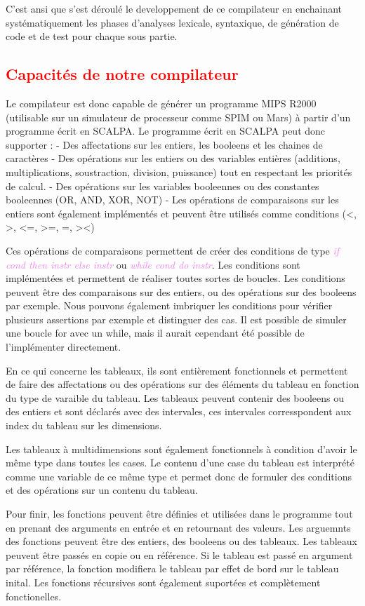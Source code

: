 \documentclass[a4paper]{article}
\let\oldtextit\textit
\renewcommand{\textit}[1]{\textcolor{violet}{\oldtextit{#1}}}
\newcommand{\csection}[1]{\textcolor{red}{\section{#1}}}
\begin{document}
C'est ansi que s'est déroulé le developpement de ce compilateur en enchainant systématiquement les phases d'analyses lexicale, syntaxique, de génération de code et de test pour chaque sous partie.

\csection{Capacités de notre compilateur}

Le compilateur est donc capable de générer un programme MIPS R2000 (utilisable sur un simulateur de processeur comme SPIM ou Mars) à partir d'un programme écrit en SCALPA.
Le programme écrit en SCALPA peut donc supporter :
- Des affectations sur les entiers, les booleens et les chaines de caractères
- Des opérations sur les entiers ou des variables entières (additions, multiplications, soustraction, division, puissance) tout en respectant les priorités de calcul.
- Des opérations sur les variables booleennes ou des constantes booleennes (OR, AND, XOR, NOT)
- Les opérations de comparaisons sur les entiers sont également implémentés et peuvent être utilisés comme conditions (<, >, <=, >=, =, ><)

Ces opérations de comparaisons permettent de créer des conditions de type \textit{if cond then instr else instr } ou \textit{while cond do instr}. Les conditions sont implémentées et permettent de réaliser toutes sortes de boucles. Les conditions peuvent être des comparaisons sur des entiers, ou des opérations sur des booleens par exemple.
Nous pouvons également imbriquer les conditions pour vérifier plusieurs assertions par exemple et distinguer des cas.
Il est possible de simuler une boucle for avec un while, mais il aurait cependant été possible de l'implémenter directement.

En ce qui concerne les tableaux, ils sont entièrement fonctionnels et permettent de faire des affectations ou des opérations sur des éléments du tableau en fonction du type de varaible du tableau. Les tableaux peuvent contenir des booleens ou des entiers et sont déclarés avec des intervales, ces intervales corresspondent aux index du tableau sur les dimensions.

Les tableaux à multidimensions sont également fonctionnels à condition d'avoir le même type dans toutes les cases. Le contenu d'une case du tableau est interprété comme une variable de ce même type et permet donc de formuler des conditions et des opérations sur un contenu du tableau.

Pour finir, les fonctions peuvent être définies et utilisées dans le programme tout en prenant des arguments en entrée et en retournant des valeurs.
Les arguemnts des fonctions peuvent être des entiers, des booleens ou des tableaux. Les tableaux peuvent être passés en copie ou en référence. Si le tableau est passé en argument par référence, la fonction modifiera le tableau par effet de bord sur le tableau inital. Les fonctions récursives sont également suportées et complètement fonctionelles.
\end{document}
